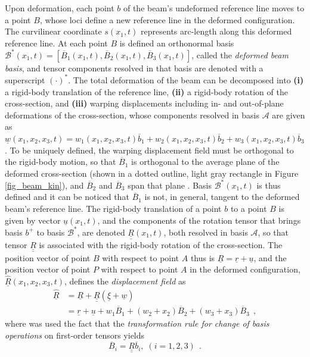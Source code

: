 \documentclass[12pt,a4paper,oneside,english]{abntex2} %
\newcommand{\vect}[1]{\underline{#1}}
\newcommand{\uvec}[1]{\overline{#1}}
\def\tens#1{\underline{\underline{#1}}}
\def\A{\mathcal{A}}
\def\bp{b^+}
\def\B*{\mathcal{B}^*}
\def\xo{x_1}
\def\R{\tens{R}}
\def\r{\vect{r}}
\begin{document}
Upon deformation, each point $b$ of the beam's undeformed reference line moves to a point $B$, whose loci define a new reference line in the deformed configuration. The curvilinear coordinate $s(\xo,t)$ represents arc-length along this deformed reference line. At each point $B$ is defined an orthonormal basis $\B*(\xo,t) = [\uvec{B}_1(\xo,t),\uvec{B}_2(\xo,t),\uvec{B}_3(\xo,t)]$, called the \textit{deformed beam basis}, and tensor components resolved in that basis are denoted with a superscript $(\cdot{})^{*}$. The total deformation of the beam can be decomposed into \textbf{(i)} a rigid-body translation of the reference line, \textbf{(ii)} a rigid-body rotation of the cross-section, and \textbf{(iii)} warping displacements including in- and out-of-plane deformations of the cross-section, whose components resolved in basis $\A$ are given as $\vect{w}(\xo,x_2,x_3,t) = w_1(\xo,x_2,x_3,t) \uvec{b}_1 + w_2(\xo,x_2,x_3,t) \uvec{b}_2 + w_3(\xo,x_2,x_3,t) \uvec{b}_3$. To be uniquely defined, the warping displacement field must be orthogonal to the rigid-body motion, so that $\uvec{B}_1$ is orthogonal to the average plane of the deformed cross-section (shown in a dotted outline, light gray rectangle in Figure \ref{fig_beam_kin}), and $\uvec{B}_2$ and $\uvec{B}_3$ span that plane \cite{bauchau2011flexible}. Basis $\B*(\xo,t)$ is thus defined and it can be noticed that $\uvec{B}_1$ is not, in general, tangent to the deformed beam's reference line. The rigid-body translation of a point $b$ to a point $B$ is given by vector $\vect{u}(\xo,t)$, and the components of the rotation tensor that brings basis $\bp$ to basis $\B*$, are denoted $\R(\xo,t)$, both resolved in basis $\A$, so that tensor $\R$ is associated with the rigid-body rotation of the cross-section. The position vector of point $B$ with respect to point $A$ thus is $\vect{R} = \r + \vect{u}$, and the position vector of point $P$ with respect to point $A$ in the deformed configuration, $\hat{\vect{R}}(\xo,x_2,x_3,t)$, defines the \textit{displacement field} as
\begin{align}
    \hat{\vect{R}} 
    &= \vect{R} + \R(\vect{\xi} + \vect{w})
    \nonumber
    \\
    &= \r + \vect{u} + w_1 \uvec{B}_1 + (w_2 + x_2) \uvec{B}_2 + (w_3 + x_3) \uvec{B}_3 \ \ ,
    \label{eq:R_hat}
\end{align}
where was used the fact that the \textit{transformation rule for change of basis operations} on first-order tensors \cite{bauchau2011flexible} yields
\begin{equation}
    \uvec{B}_i = \R \uvec{b}_i, \; (i = 1,2,3) \ \ .
    \label{eq:B_i}
\end{equation}
\end{document}
